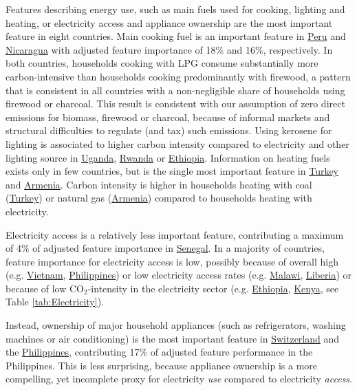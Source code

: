 \documentclass[12pt, a4paper]{article}
\begin{document}
Features describing energy use, such as main fuels used for cooking, lighting and heating, or electricity access and appliance ownership are the most important feature in eight countries. Main cooking fuel is an important feature in \hyperref[fig:5b_PER]{Peru} and \hyperref[fig:5b_NIC]{Nicaragua} with adjusted feature importance of 18\% and 16\%, respectively. In both countries, households cooking with LPG consume substantially more carbon-intensive than households cooking predominantly with firewood, a pattern that is consistent in all countries with a non-negligible share of households using firewood or charcoal. This result is consistent with our assumption of zero direct emissions for biomass, firewood or charcoal, because of informal markets and structural difficulties to regulate (and tax) such emissions. Using kerosene for lighting is associated to higher carbon intensity compared to electricity and other lighting source in \hyperref[fig:5b_UGA]{Uganda}, \hyperref[fig:5b_RWA]{Rwanda} or \hyperref[fig:5b_ETH]{Ethiopia}. Information on heating fuels exists only in few countries, but is the single most important feature in \hyperref[fig:5b_TUR]{Turkey} and \hyperref[fig:5b_ARM]{Armenia}. Carbon intensity is higher in households heating with coal (\hyperref[fig:5b_TUR]{Turkey}) or natural gas (\hyperref[fig:5b_ARM]{Armenia}) compared to households heating with electricity.

Electricity access is a relatively less important feature, contributing a maximum of 4\% of adjusted feature importance in \hyperref[fig:5b_SEN]{Senegal}. In a majority of countries, feature importance for electricity access is low, possibly because of overall high (e.g. \hyperref[fig:5b_VNM]{Vietnam}, \hyperref[fig:5b_PHL]{Philippines}) or low electricity access rates (e.g. \hyperref[fig:5b_MWI]{Malawi}, \hyperref[fig:5b_LBR]{Liberia}) or because of low CO$_{2}$-intensity in the electricity sector (e.g. \hyperref[fig:5b_ETH]{Ethiopia}, \hyperref[fig:5b_KEN]{Kenya}, see Table \ref{tab:Electricity}). %

Instead, ownership of major household appliances (such as refrigerators, washing machines or air conditioning) is the most important feature in \hyperref[fig:5b_CHE]{Switzerland} and the \hyperref[fig:5b_PHL]{Philippines}, contributing 17\% of adjusted feature performance in the Philippines. This is less surprising, because appliance ownership is a more compelling, yet incomplete proxy for electricity \textit{use} compared to electricity \textit{access}.
\end{document}
